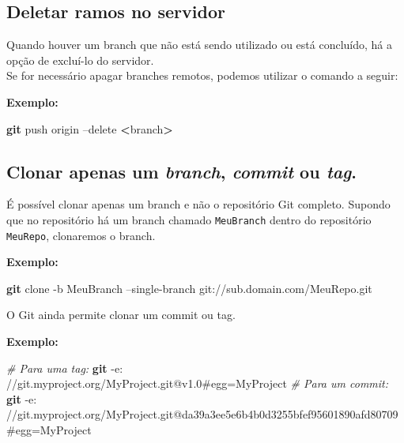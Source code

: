 \documentclass[
  a5paper,
  pagesize,
  9pt,
  pointlessnumbers,
  normalheadings,
  twoside=false
]{book}
\newenvironment{Shaded}{\begin{snugshade}}{\end{snugshade}}
\newcommand{\KeywordTok}[1]{\textcolor[rgb]{0.13,0.29,0.53}{\textbf{{#1}}}}
\newcommand{\CommentTok}[1]{\textcolor[rgb]{0.56,0.35,0.01}{\textit{{#1}}}}
\newcommand{\NormalTok}[1]{{#1}}
\begin{document}
\subsection{Deletar ramos no servidor}\label{deletar-ramos-no-servidor}

Quando houver um branch que não está sendo utilizado ou está concluído,
há a opção de excluí-lo do servidor.\\Se for necessário apagar branches
remotos, podemos utilizar o comando a seguir:

\textbf{Exemplo:}

\begin{Shaded}
\begin{Highlighting}[]
\KeywordTok{git} \NormalTok{push origin --delete }\KeywordTok{<}\NormalTok{branch}\KeywordTok{>}
\end{Highlighting}
\end{Shaded}

\subsection{Clonar apenas um \emph{branch}, \emph{commit} ou
\emph{tag}.}\label{clonar-apenas-um-branch-commit-ou-tag.}

É possível clonar apenas um branch e não o repositório Git completo.
Supondo que no repositório há um branch chamado \texttt{MeuBranch}
dentro do repositório \texttt{MeuRepo}, clonaremos o branch.

\textbf{Exemplo:}

\begin{Shaded}
\begin{Highlighting}[]
\KeywordTok{git} \NormalTok{clone -b MeuBranch --single-branch git://sub.domain.com/MeuRepo.git}
\end{Highlighting}
\end{Shaded}

O Git ainda permite clonar um commit ou tag.

\textbf{Exemplo:}

\begin{Shaded}
\begin{Highlighting}[]
\CommentTok{# Para uma tag:}
\KeywordTok{git} \NormalTok{-e: //git.myproject.org/MyProject.git@v1.0#egg=MyProject}
\CommentTok{# Para um commit:}
\KeywordTok{git} \NormalTok{-e: //git.myproject.org/MyProject.git@da39a3ee5e6b4b0d3255bfef95601890afd80709#egg=MyProject}
\end{Highlighting}
\end{Shaded}
\end{document}
